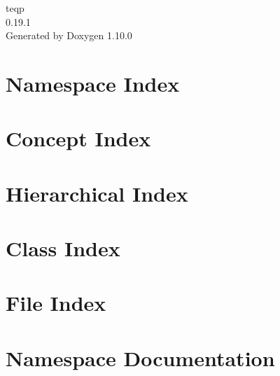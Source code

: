 \documentclass[twoside]{book}
\newcommand{\+}{\discretionary{\mbox{\scriptsize$\hookleftarrow$}}{}{}}
\newcommand{\clearemptydoublepage}{%
    \newpage{\pagestyle{empty}\cleardoublepage}%
  }
\begin{document}
  \raggedbottom
    \hypersetup{pageanchor=false,
                bookmarksnumbered=true,
                pdfencoding=unicode
               }
  \begin{titlepage}
  \vspace*{7cm}
  \begin{center}%
  {\Large teqp}\\
  [1ex]\large 0.\+19.\+1 \\
  \vspace*{1cm}
  {\large Generated by Doxygen 1.10.0}\\
  \end{center}
  \end{titlepage}
  \clearemptydoublepage
  \tableofcontents
  \clearemptydoublepage
  \hypersetup{pageanchor=true}
\chapter{Namespace Index}

\chapter{Concept Index}

\chapter{Hierarchical Index}

\chapter{Class Index}

\chapter{File Index}

\chapter{Namespace Documentation}



























\end{document}
